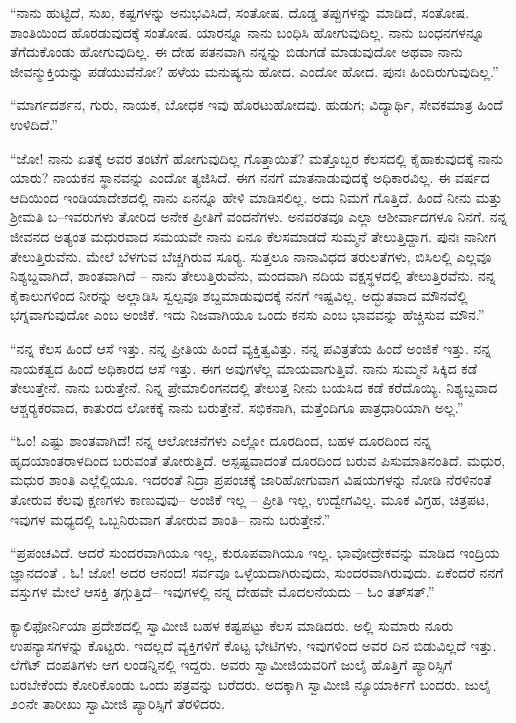  “ನಾನು ಹುಟ್ಟಿದೆ, ಸುಖ, ಕಷ್ಟಗಳನ್ನು ಅನುಭವಿಸಿದೆ, ಸಂತೋಷ. ದೊಡ್ಡ ತಪ್ಪುಗಳನ್ನು ಮಾಡಿದೆ, ಸಂತೋಷ. ಶಾಂತಿಯಿಂದ ಹೊರಡುವುದಕ್ಕೆ ಸಂತೋಷ. ಯಾರನ್ನೂ ನಾನು ಬಂಧಿಸಿ ಹೋಗುವುದಿಲ್ಲ. ನಾನು ಬಂಧನಗಳನ್ನೂ ತೆಗೆದುಕೊಂಡು ಹೋಗುವುದಿಲ್ಲ. ಈ ದೇಹ ಪತನವಾಗಿ ನನ್ನನ್ನು ಬಿಡುಗಡೆ ಮಾಡುವುದೋ ಅಥವಾ ನಾನು ಜೀವನ್ಮುಕ್ತಿಯನ್ನು ಪಡೆಯುವೆನೋ? ಹಳೆಯ ಮನುಷ್ಯನು ಹೋದ. ಎಂದೋ ಹೋದ. ಪುನಃ ಹಿಂದಿರುಗುವುದಿಲ್ಲ.” 

 “ಮಾರ್ಗದರ್ಶನ, ಗುರು, ನಾಯಕ, ಬೋಧಕ ಇವು ಹೊರಟುಹೋದವು. ಹುಡುಗ; ವಿದ್ಯಾರ್ಥಿ, ಸೇವಕಮಾತ್ರ ಹಿಂದೆ ಉಳಿದಿದೆ.” 

 “ಜೋ! ನಾನು ಏತಕ್ಕೆ ಅವರ ತಂಟೆಗೆ ಹೋಗುವುದಿಲ್ಲ ಗೊತ್ತಾಯಿತೆ? ಮತ್ತೊಬ್ಬರ ಕೆಲಸದಲ್ಲಿ ಕೈಹಾಕುವುದಕ್ಕೆ ನಾನು ಯಾರು? ನಾಯಕನ ಸ್ಥಾನವನ್ನು ಎಂದೋ ತ್ಯಜಿಸಿದೆ. ಈಗ ನನಗೆ ಮಾತನಾಡುವುದಕ್ಕೆ ಅಧಿಕಾರವಿಲ್ಲ. ಈ ವರ್ಷದ ಆದಿಯಿಂದ ಇಂಡಿಯಾದೇಶದಲ್ಲಿ ನಾನು ಏನನ್ನೂ ಹೇಳಿ ಮಾಡಿಸಲಿಲ್ಲ. ಅದು ನಿಮಗೆ ಗೊತ್ತಿದೆ. ಹಿಂದೆ ನೀನು ಮತ್ತು ಶ‍್ರೀಮತಿ ಬ–ಇವರುಗಳು ತೋರಿದ ಅನೇಕ ಪ್ರೀತಿಗೆ ವಂದನೆಗಳು. ಅನವರತವೂ ಎಲ್ಲಾ ಆಶೀರ್ವಾದಗಳೂ ನಿನಗೆ. ನನ್ನ ಜೀವನದ ಅತ್ಯಂತ ಮಧುರವಾದ ಸಮಯವೇ ನಾನು ಏನೂ ಕೆಲಸಮಾಡದೆ ಸುಮ್ಮನೆ ತೇಲುತ್ತಿದ್ದಾಗ. ಪುನಃ ನಾನೀಗ ತೇಲುತ್ತಿರುವೆನು. ಮೇಲೆ ಬೆಳಗುವ ಬೆಚ್ಚಗಿರುವ ಸೂರ‍್ಯ. ಸುತ್ತಲೂ ನಾನಾವಿಧದ ತರುಲತೆಗಳು, ಬಿಸಿಲಲ್ಲಿ ಎಲ್ಲವೂ ನಿಶ್ಯಬ್ದವಾಗಿದೆ, ಶಾಂತವಾಗಿದೆ – ನಾನು ತೇಲುತ್ತಿರುವೆನು, ಮಂದವಾಗಿ ನದಿಯ ವಕ್ಷಸ್ಥಳದಲ್ಲಿ ತೇಲುತ್ತಿರವೆನು. ನನ್ನ ಕೈಕಾಲುಗಳಿಂದ ನೀರನ್ನು ಅಲ್ಲಾಡಿಸಿ ಸ್ವಲ್ಪವೂ ಶಬ್ದಮಾಡುವುದಕ್ಕೆ ನನಗೆ ಇಷ್ಟವಿಲ್ಲ. ಅದ್ಭುತವಾದ ಮೌನವೆಲ್ಲಿ ಭಗ್ನವಾಗುವುದೋ ಎಂಬ ಅಂಜಿಕೆ. ಇದು ನಿಜವಾಗಿಯೂ ಒಂದು ಕನಸು ಎಂಬ ಭಾವವನ್ನು ಹೆಚ್ಚಿಸುವ ಮೌನ.” 

 “ನನ್ನ ಕೆಲಸ ಹಿಂದೆ ಆಸೆ ಇತ್ತು. ನನ್ನ ಪ್ರೀತಿಯ ಹಿಂದೆ ವ್ಯಕ್ತಿತ್ವವಿತ್ತು. ನನ್ನ ಪವಿತ್ರತೆಯ ಹಿಂದೆ ಅಂಜಿಕೆ ಇತ್ತು. ನನ್ನ ನಾಯಕತ್ವದ ಹಿಂದೆ ಅಧಿಕಾರದ ಆಸೆ ಇತ್ತು. ಈಗ ಅವುಗಳೆಲ್ಲ ಮಾಯವಾಗುತ್ತಿವೆ. ನಾನು ಸುಮ್ಮನೆ ಸಿಕ್ಕಿದ ಕಡೆ ತೇಲುತ್ತೇನೆ. ನಾನು ಬರುತ್ತೇನೆ. ನಿನ್ನ ಪ್ರೇಮಾಲಿಂಗನದಲ್ಲಿ ತೇಲುತ್ತ ನೀನು ಬಯಸಿದ ಕಡೆ ಕರೆದೊಯ್ಯಿ. ನಿಶ್ಯಬ್ದವಾದ ಆಶ್ಚರ‍್ಯಕರವಾದ, ಕಾತುರದ ಲೋಕಕ್ಕೆ ನಾನು ಬರುತ್ತೇನೆ. ಸಭಿಕನಾಗಿ, ಮತ್ತೆಂದಿಗೂ ಪಾತ್ರಧಾರಿಯಾಗಿ ಅಲ್ಲ.” 

 “ಓಂ! ಎಷ್ಟು ಶಾಂತವಾಗಿದೆ! ನನ್ನ ಆಲೋಚನೆಗಳು ಎಲ್ಲೋ ದೂರದಿಂದ, ಬಹಳ ದೂರದಿಂದ ನನ್ನ ಹೃದಯಾಂತರಾಳದಿಂದ ಬರುವಂತೆ ತೋರುತ್ತಿದೆ. ಅಸ್ಪಷ್ಟವಾದಂತೆ ದೂರದಿಂದ ಬರುವ ಪಿಸುಮಾತಿನಂತಿದೆ. ಮಧುರ, ಮಧುರ ಶಾಂತಿ ಎಲ್ಲೆಲ್ಲಿಯೂ. ಇದರಂತೆ ನಿದ್ರಾ ಪ್ರಪಂಚಕ್ಕೆ ಜಾರಿಹೋಗುವಾಗ ವಿಷಯಗಳನ್ನು ನೋಡಿ ನೆರಳಿನಂತೆ ತೋರುವ ಕೆಲವು ಕ್ಷಣಗಳು ಕಾಣುವುವು– ಅಂಜಿಕೆ ಇಲ್ಲ – ಪ್ರೀತಿ ಇಲ್ಲ, ಉದ್ವೇಗವಿಲ್ಲ. ಮೂಕ ವಿಗ್ರಹ, ಚಿತ್ರಪಟ, ಇವುಗಳ ಮಧ್ಯದಲ್ಲಿ ಒಬ್ಬನಿರುವಾಗ ತೋರುವ ಶಾಂತಿ– ನಾನು ಬರುತ್ತೇನೆ.” 

 “ಪ್ರಪಂಚವಿದೆ. ಆದರೆ ಸುಂದರವಾಗಿಯೂ ಇಲ್ಲ, ಕುರೂಪವಾಗಿಯೂ ಇಲ್ಲ. ಭಾವೋದ್ರೇಕವನ್ನು ಮಾಡಿದ ಇಂದ್ರಿಯ ಜ್ಞಾನದಂತೆ . ಓ! ಜೋ! ಅದರ ಆನಂದ! ಸರ್ವವೂ ಒಳ್ಳೆಯದಾಗಿರುವುದು, ಸುಂದರವಾಗಿರುವುದು. ಏಕೆಂದರೆ ನನಗೆ ವಸ್ತುಗಳ ಮೇಲೆ ಆಸಕ್ತಿ ತಗ್ಗುತ್ತಿದೆ– ಇವುಗಳಲ್ಲಿ ನನ್ನ ದೇಹವೇ ಮೊದಲನೆಯದು – ಓಂ ತತ್‍ಸತ್.” 

 ಕ್ಯಾಲಿಫೋರ್ನಿಯಾ ಪ್ರದೇಶದಲ್ಲಿ ಸ್ವಾಮೀಜಿ ಬಹಳ ಕಷ್ಟಪಟ್ಟು ಕೆಲಸ ಮಾಡಿದರು. ಅಲ್ಲಿ ಸುಮಾರು ನೂರು ಉಪನ್ಯಾಸಗಳನ್ನು ಕೊಟ್ಟರು. ಇದಲ್ಲದೆ ವ್ಯಕ್ತಿಗಳಿಗೆ ಕೊಟ್ಟ ಭೇಟಿಗಳು, ಇವುಗಳಿಂದ ಅವರ ದಿನ ಬಿಡುವಿಲ್ಲದೆ ಇತ್ತು. ಲೆಗೆಟ್ ದಂಪತಿಗಳು ಆಗ ಲಂಡನ್ನಿನಲ್ಲಿ ಇದ್ದರು. ಅವರು ಸ್ವಾಮೀಜಿಯವರಿಗೆ ಜುಲೈ ಹೊತ್ತಿಗೆ ಪ್ಯಾರಿಸ್ಸಿಗೆ ಬರಬೇಕೆಂದು ಕೋರಿಕೊಂಡು ಒಂದು ಪತ್ರವನ್ನು ಬರೆದರು. ಅದಕ್ಕಾಗಿ ಸ್ವಾಮೀಜಿ ನ್ಯೂಯಾರ್ಕಿಗೆ ಬಂದರು. ಜುಲೈ ೨೦ನೇ ತಾರೀಖು ಸ್ವಾಮೀಜಿ ಪ್ಯಾರಿಸ್ಸಿಗೆ ತೆರಳಿದರು. 


